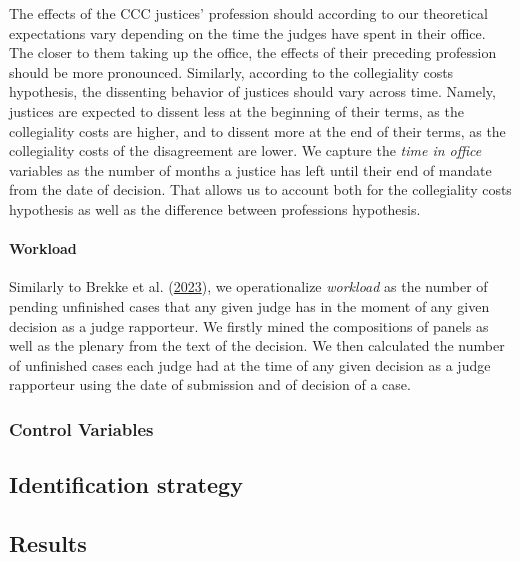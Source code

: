 \documentclass[
  11pt,
]{article}
\begin{document}
The effects of the CCC justices' profession should according to our
theoretical expectations vary depending on the time the judges have
spent in their office. The closer to them taking up the office, the
effects of their preceding profession should be more pronounced.
Similarly, according to the collegiality costs hypothesis, the
dissenting behavior of justices should vary across time. Namely,
justices are expected to dissent less at the beginning of their terms,
as the collegiality costs are higher, and to dissent more at the end of
their terms, as the collegiality costs of the disagreement are lower. We
capture the \emph{time in office} variables as the number of months a
justice has left until their end of mandate from the date of decision.
That allows us to account both for the collegiality costs hypothesis as
well as the difference between professions hypothesis.

\hypertarget{workload}{%
\paragraph{Workload}\label{workload}}

Similarly to Brekke et al.
(\protect\hyperlink{ref-brekkeThatOrderHow2023}{2023}), we
operationalize \emph{workload} as the number of pending unfinished cases
that any given judge has in the moment of any given decision as a judge
rapporteur. We firstly mined the compositions of panels as well as the
plenary from the text of the decision. We then calculated the number of
unfinished cases each judge had at the time of any given decision as a
judge rapporteur using the date of submission and of decision of a case.

\hypertarget{control-variables}{%
\subsubsection{Control Variables}\label{control-variables}}

\hypertarget{identification-strategy}{%
\subsection{Identification strategy}\label{identification-strategy}}

\hypertarget{results}{%
\subsection{Results}\label{results}}
\end{document}
